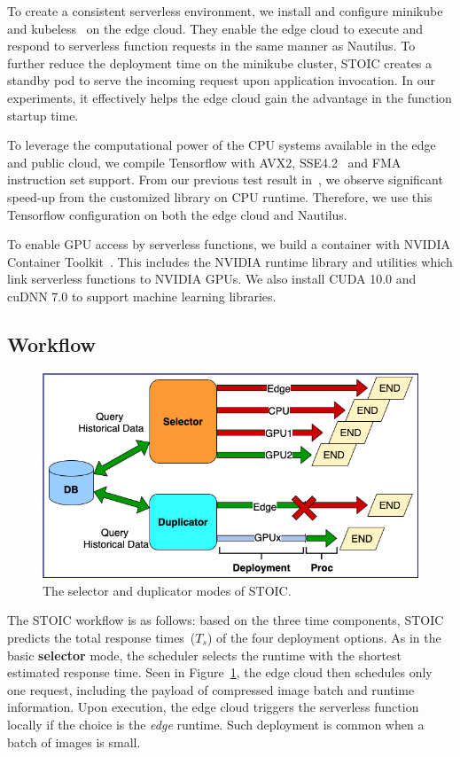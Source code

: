 To create a consistent serverless environment, we install and configure
minikube~\cite{ref:minikube} and kubeless~\cite{ref:kubeless} on the edge
cloud. They enable the edge cloud to execute and respond to serverless
function requests in the same manner as Nautilus. To further reduce the
deployment time on the minikube cluster, STOIC creates a standby pod to serve
the incoming request upon application invocation. In our experiments, it
effectively helps the edge cloud gain the advantage in the function startup
time. 

To leverage the computational power of the CPU systems available in the edge
and public cloud, we compile Tensorflow with AVX2, SSE4.2~\cite{ref:avx} and
FMA~\cite{ref:fma} instruction set support. From our previous test result
in~\cite{ref:stoic}, we observe significant speed-up from the customized
library on CPU runtime. Therefore, we use this Tensorflow configuration on
both the edge cloud and Nautilus.
 
To enable GPU access by serverless functions, we build a container with NVIDIA
Container Toolkit~\cite{ref:nvidia}. This includes the NVIDIA runtime library
and utilities which link serverless functions to NVIDIA GPUs. We also install
CUDA 10.0 and cuDNN 7.0 to support machine learning libraries.
 
 
 \subsection{Workflow}

\begin{figure}[t] \centering 
\includegraphics[scale=0.33]{figures/selector_duplicator.png}
\caption{The selector and duplicator modes of STOIC. 
\label{fig:duplicator}}
\end{figure}

The STOIC workflow is as follows: based on the three time components, STOIC
predicts the total response times~($T_s$) of the four deployment options. As
in the basic \textbf{selector} mode, the scheduler selects the runtime with
the shortest estimated response time. Seen in Figure~\ref{fig:duplicator}, the
edge cloud then schedules only one request, including the payload of
compressed image batch and runtime information. Upon execution, the edge cloud
triggers the serverless function locally if the choice is the \textit{edge}
runtime. Such deployment is common when a batch of images is small. 

